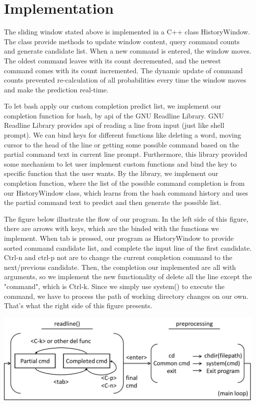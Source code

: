 \documentclass[11pt,a4paper]{article}
\begin{document}
\section*{Implementation}
The sliding window stated above is implemented in a C++ class HistoryWindow. The class provide methods to update window content, query command counts and generate candidate list.
When a new command is entered, the window moves. The oldest command leaves with its count decremented, and the newest command comes with its count incremented. The dynamic update of command counts prevented re-calculation of all probabilities every time the window moves and make the prediction real-time.
\par
To let bash apply our custom completion predict list, 
we implement our completion function for bash, by api of the GNU Readline Library. 
GNU Readline Library provides api of reading a line from input (just like shell prompt).
We can bind keys for different functions like deleting a word, 
moving cursor to the head of the line or getting some possible command 
based on the partial command text in current line prompt. 
Furthermore, this library provided some mechanism to let user implement custom functions 
and bind the key to specific function that the user wants. 
By the library, we implement our completion function, 
where the list of the possible command completion is from our HistoryWindow class, 
which learns from the bash command history and uses the partial command text 
to predict and then generate the possible list.
\par
The figure below illustrate the flow of our program.
In the left side of this figure, there are arrows with keys, 
which are the binded with the functions we implement. 
When tab is pressed, our program as HistoryWindow to provide sorted command candidate list, and complete the input line of the first candidate.
Ctrl-n and ctrl-p not are to change the current completion command to the next/previous candidate.
Then, the completion our implemented are all with arguments, so we implement the new functionality of delete
all the line except the "command", which is Ctrl-k.
Since we simply use system() to execute the command, we have to process the path of working directory changes on our own.
That's what the right side of this figure presents.
\\
\begin{center}
\includegraphics[scale=0.6]{pic.png}
\end{center}
\end{document}
